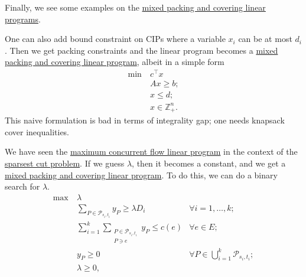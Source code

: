 Finally, we see some examples on the \hyperref[def:mixed-packing-covering-LP]{mixed packing and covering linear programs}.

\begin{eg}
	One can also add bound constraint on CIPs where a variable \(x_i\) can be at most \(d_i\). Then we get packing constraints and the linear program becomes a \hyperref[def:mixed-packing-covering-LP]{mixed packing and covering linear program}, albeit in a simple form
	\[
		\begin{aligned}
			\min~ & c^{\top} x               \\
			      & Ax \geq b ;              \\
			      & x \leq d ;               \\
			      & x \in \mathbb{Z} _{+}^n.
		\end{aligned}
	\]
	This naive formulation is bad in terms of integrality gap; one needs knapsack cover inequalities.
\end{eg}

\begin{eg}
	We have seen the \hyperref[eq:non-uniform-sparsest-cut-LP-dual]{maximum concurrent flow linear program} in the context of the \hyperref[prb:non-uniform-sparsest-cut]{sparsest cut problem}. If we guess \(\lambda \), then it becomes a constant, and we get a \hyperref[def:mixed-packing-covering-LP]{mixed packing and covering linear program}. To do this, we can do a binary search for \(\lambda \).
	\[
		\begin{aligned}
			\max~ & \lambda                                                                                                                 \\
			      & \sum_{P \in \mathcal{P} _{s_i, t_i}} y_P \geq \lambda D_i    & \forall i = 1, \dots , k;                                \\
			      & \sum_{i=1}^{k} \sum_{\substack{P \in \mathcal{P} _{s_i, t_i}                                                            \\ P \ni e}} y_P \leq c(e) & \forall e \in E;                                         \\
			      & y_P \geq 0                                                   & \forall P \in \bigcup_{i=1}^{k} \mathcal{P} _{s_i, t_i}; \\
			      & \lambda \geq 0,
		\end{aligned}
	\]
\end{eg}

